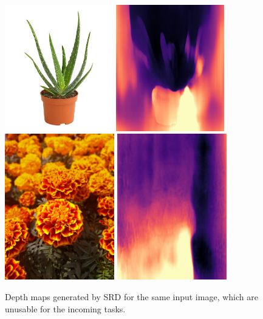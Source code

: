 \documentclass[12pt, letterpaper]{article}
\begin{document}
\begin{spacing}{1.15}
\begin{figure}[!ht]
    \begin{center}
        \includegraphics[height = 5.5cm]{jardins-du-senegal-aloe-vera-28830638178417_1200x1200}
        \includegraphics[height = 5.5cm]{jardins-du-senegal-aloe-vera-28830638178417_1200x1200_disp}\\
        \includegraphics[height = 6.35cm]{example_0}
        \includegraphics[height = 6.35cm]{example_0_disp}
        \caption{Depth maps generated by SRD for the same input image, which are unusable for the incoming tasks.}
        \label{SRDfail}
    \end{center}
\end{figure}


\end{spacing}
\end{document}
